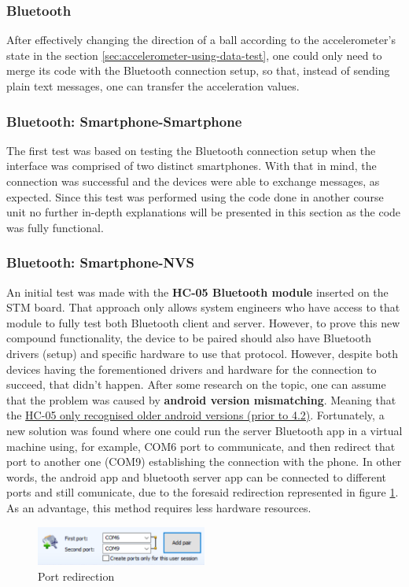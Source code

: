 \subsubsection{Bluetooth}%
\label{sec:bluetooth-test}
After effectively changing the direction of a ball according to the accelerometer's state in the section \ref{sec:accelerometer-using-data-test}, one could only need to merge its code with the Bluetooth connection setup, so that, instead of sending plain text messages, one can transfer the acceleration values.
%
\subsubsection{Bluetooth: Smartphone-Smartphone}%
\label{sec:bluetooth-phone-phone}
%
The first test was based on testing the Bluetooth connection setup when the interface was comprised of two distinct smartphones. With that in mind, the connection was successful and the devices were able to exchange messages, as expected. Since this test was performed using the code done in another course unit no further in-depth explanations will be presented in this section as the code was fully functional.
%
\subsubsection{Bluetooth: Smartphone-NVS}%
\label{sec:bluetooth-phone-nvs}
%
An initial test was made with the \textbf{HC-05 Bluetooth module} inserted on the STM board. That approach only allows system engineers who have access to that module to fully test both Bluetooth client and server. 
%
However, to prove this new compound functionality, the device to be paired should also have Bluetooth drivers (setup) and specific hardware to use that protocol.
%
However, despite both devices having the forementioned drivers and hardware for the connection to succeed, that didn't happen. After some research on the topic, one can assume that the problem was caused by \textbf{android version mismatching}. Meaning that the \underline{HC-05 only recognised older android versions (prior to 4.2)}.
%
Fortunately, a new solution was found where one could run the server Bluetooth app in a virtual machine using, for example, COM6 port to communicate, and then redirect that port to another one (COM9) establishing the connection with the phone. In other words, the android app and bluetooth server app can be connected to different ports and still comunicate, due to the foresaid redirection represented in figure \ref{fig:port-red}. As an advantage, this method requires less hardware resources.\\
%
\begin{figure}[!ht]
\centering
\includegraphics[width=0.5\textwidth]{img/port-red.png}
\caption{\label{fig:port-red}Port redirection}
\end{figure}
%
